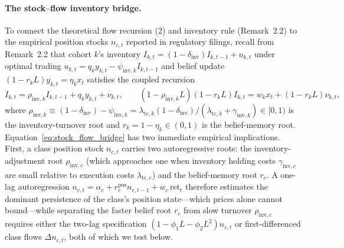 \documentclass[12pt]{article}
\theoremstyle{definition}
\theoremstyle{remark}
\begin{document}
\paragraph{The stock--flow inventory bridge.} To connect the theoretical flow recursion (2) and inventory rule (Remark~2.2) to the empirical position stocks $n_{c,t}$ reported in regulatory filings, recall from Remark~2.2 that cohort $k$'s inventory $I_{k,t}=(1-\delta_{\mathrm{inv}})I_{k,t-1}+u_{k,t}$ under optimal trading $u_{k,t}=q_k y_{k,t}-\psi_{\mathrm{inv},k}I_{k,t-1}$ and belief update $(1-r_k L)y_{k,t}=\eta_k x_t$ satisfies the coupled recursion
\begin{equation}
I_{k,t}=\rho_{\mathrm{inv},k}I_{k,t-1}+q_k y_{k,t}+\nu_{k,t},\qquad (1-\rho_{\mathrm{inv},k}L)(1-r_k L)I_{k,t}=w_k x_t+(1-r_k L)\nu_{k,t},
\label{eq:stock_flow_bridge}
\end{equation}
where $\rho_{\mathrm{inv},k}\equiv (1-\delta_{\mathrm{inv}})-\psi_{\mathrm{inv},k}=\lambda_{\mathrm{tc},k}(1-\delta_{\mathrm{inv}})/(\lambda_{\mathrm{tc},k}+\gamma_{\mathrm{inv},k})\in[0,1)$ is the inventory-turnover root and $r_k=1-\eta_k\in(0,1)$ is the belief-memory root. Equation~\eqref{eq:stock_flow_bridge} has two immediate empirical implications. First, a class position stock $n_{c,t}$ carries two autoregressive roots: the inventory-adjustment root $\rho_{\mathrm{inv},c}$ (which approaches one when inventory holding costs $\gamma_{\mathrm{inv},c}$ are small relative to execution costs $\lambda_{\mathrm{tc},c}$) and the belief-memory root $r_c$. A one-lag autoregression $n_{c,t}=\alpha_c+r_c^{\mathrm{pos}}n_{c,t-1}+w_c\,\mathrm{ret}_t$ therefore estimates the dominant persistence of the class's position state---which prices alone cannot bound---while separating the faster belief root $r_c$ from slow turnover $\rho_{\mathrm{inv},c}$ requires either the two-lag specification $(1-\phi_1 L-\phi_2 L^2)n_{c,t}$ or first-differenced class flows $\Delta n_{c,t}$, both of which we test below.
\end{document}
